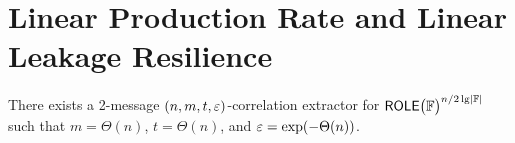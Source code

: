 \section{Linear Production Rate and Linear Leakage Resilience}
	\begin{theorem}
		\label{thm:main} 
		There exists a 2-message $(n,m,t,\varepsilon)$-correlation extractor for $\ROLE[\bbF]^{n/2\lg\abs\bbF}$  such that $m=\Theta(n)$, $t=\Theta(n)$, and $\varepsilon=\exp(-\Theta(n))$. %
	\end{theorem}